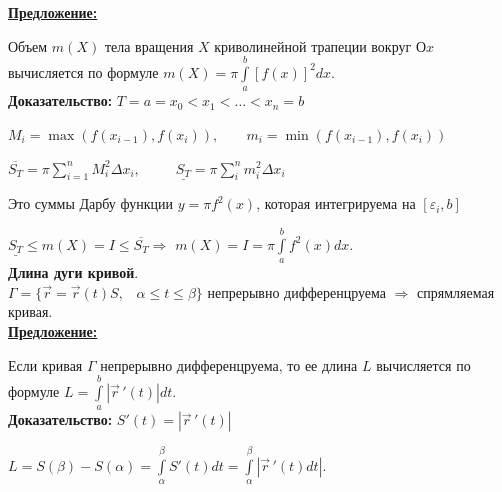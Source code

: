 \documentclass[a4paper,12pt]{article} %
\renewcommand {\leq}{\leqslant}
\begin{document}
\underline{\textbf{Предложение:}}

Объем $m(X)$ тела вращения $X$ криволинейной трапеции вокруг $Оx$ вычисляется по формуле $m(X) = \pi \int\limits_a^b[f(x)]^2dx$.\\

\textbf{Доказательство:} $T={a=x_0<x_1<\dots<x_n = b}$

$M_i = \max (f(x_{i-1}), f(x_i)), \;\;\;\;\;\;\; m_i=\min (f(x_{i-1}), f(x_i))$

$\overline{S_T} = \pi \sum\limits_{i=1}^n M_i^2 \Delta x_i, \;\;\;\;\;\;\;\;\; \underline{S_T} = \pi \sum\limits_i^n m_i^2 \Delta x_i$

Это суммы Дарбу функции $y = \pi f^2(x)$, которая интегрируема на $[\varepsilon_i, b]$

$\underline{S_T} \leq m(X) = I \leq \overline{S_T} \Rightarrow$ $m(X) = I = \pi \int\limits_a^b f^2(x)dx$.\\

\noindent \textbf{Длина дуги кривой}.\\

$\Gamma = \{\Vec{r} = \Vec{r}(t)S,\;\;\; \alpha \leq t \leq \beta\}$ непрерывно дифференцруема $\Rightarrow$ спрямляемая кривая.\\

\underline{\textbf{Предложение:}}

Если кривая $\Gamma$ непрерывно дифференцруема, то ее длина $L$ вычисляется по формуле $L=\int\limits_a^b |\Vec{r}\,'(t)|dt$.\\

\textbf{Доказательство:} $S'(t)=|\Vec{r}\,'(t)|$

$L = S(\beta) - S(\alpha) = \int \limits_{\alpha}^{\beta} S'(t)dt = \int \limits_{\alpha}^{\beta} |\Vec{r}\,'(t) dt|$.
\end{document}
